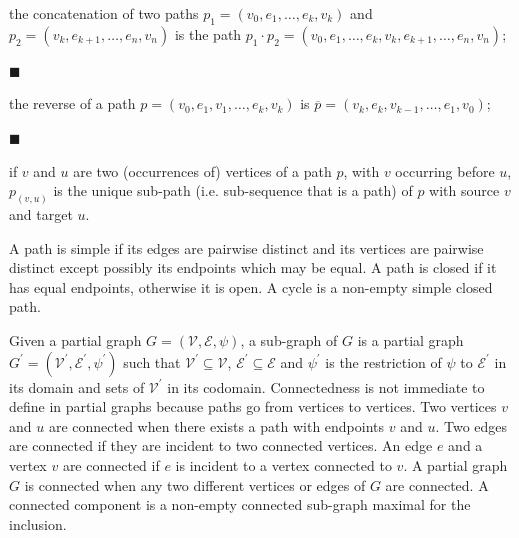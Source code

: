 the concatenation of two paths $p_{1}=(v_{0},e_{1},\dots,e_{k},v_{k})$ and $p_{2}=(v_{k},e_{k+1},\dots,e_{n},v_{n})$ is the path $p_{1}\cdot p_{2}=(v_{0},e_{1},\dots,e_{k},v_{k},e_{k+1},\dots,e_{n},v_{n})$;\par
 
 
 
\par\noindent  $\blacksquare$ 
 
the reverse of a path $p=(v_{0},e_{1},v_{1},\dots,e_{k},v_{k})$ is $\overline{p}=(v_{k},e_{k},v_{k-1},\dots,e_{1},v_{0})$;\par
 
 
 
\par\noindent  $\blacksquare$ 
 
if $v$ and $u$ are two (occurrences of) vertices of a path $p$, with $v$ occurring before $u$, ${p}_{(v,u)}$ is the unique sub-path (i.e. sub-sequence that is a path) of $p$ with source $v$ and target $u$.\par
 
 
  
 
 
A path is simple if its edges are pairwise distinct and its vertices are pairwise distinct except possibly its endpoints which may be equal. A path is closed if it has equal endpoints, otherwise it is open. A cycle is a non-empty simple closed path.\par
 
 
 
Given a partial graph $G=(\mathcal{V},\mathcal{E},\psi)$, a sub-graph of $G$ is a partial graph $G^{\prime}=(\mathcal{V}^{\prime},\mathcal{E}^{\prime},\psi^{\prime})$ such that $\mathcal{V}^{\prime}\subseteq\mathcal{V}$, $\mathcal{E}^{\prime}\subseteq\mathcal{E}$ and $\psi^{\prime}$ is the restriction of $\psi$ to $\mathcal{E}^{\prime}$ in its domain and sets of $\mathcal{V}^{\prime}$ in its codomain. Connectedness is not immediate to define in partial graphs because paths go from vertices to vertices. Two vertices $v$ and $u$ are connected when there exists a path with endpoints $v$ and $u$. Two edges are connected if they are incident to two connected vertices. An edge $e$ and a vertex $v$ are connected if $e$ is incident to a vertex connected to $v$. A partial graph $G$ is connected when any two different vertices or edges of $G$ are connected. A connected component is a non-empty connected sub-graph maximal for the inclusion.\par
 
